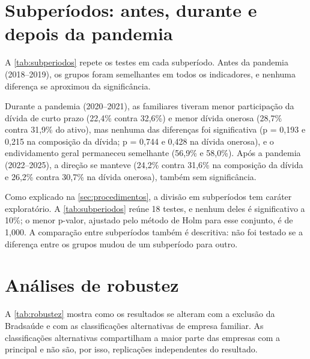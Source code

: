 

\section{Subperíodos: antes, durante e depois da pandemia}\label{sec:subperiodos}

A \autoref{tab:subperiodos} repete os testes em cada subperíodo. Antes da pandemia
(2018--2019), os grupos foram semelhantes em todos os indicadores, e nenhuma
diferença se aproximou da significância.



Durante a pandemia (2020--2021), as familiares tiveram menor participação da dívida
de curto prazo (22,4\% contra 32,6\%) e menor dívida onerosa (28,7\% contra 31,9\% do
ativo), mas nenhuma das diferenças foi significativa (p = 0,193 e 0,215 na
composição da dívida; p = 0,744 e 0,428 na dívida onerosa), e o endividamento geral
permaneceu semelhante (56,9\% e 58,0\%). Após a pandemia (2022--2025), a direção se
manteve (24,2\% contra 31,6\% na composição da dívida e 26,2\% contra 30,7\% na dívida
onerosa), também sem significância.

Como explicado na \autoref{sec:procedimentos}, a divisão em subperíodos tem caráter
exploratório. A \autoref{tab:subperiodos} reúne 18 testes, e nenhum deles é
significativo a 10\%; o menor p-valor, ajustado pelo método de Holm para esse
conjunto, é de 1,000. A comparação entre subperíodos também é descritiva: não foi
testado se a diferença entre os grupos mudou de um subperíodo para outro.

\section{Análises de robustez}\label{sec:robustez}

A \autoref{tab:robustez} mostra como os resultados se alteram com a exclusão da
Bradsaúde e com as classificações alternativas de empresa familiar. As
classificações alternativas compartilham a maior parte das empresas com a
principal e não são, por isso, replicações independentes do resultado.



